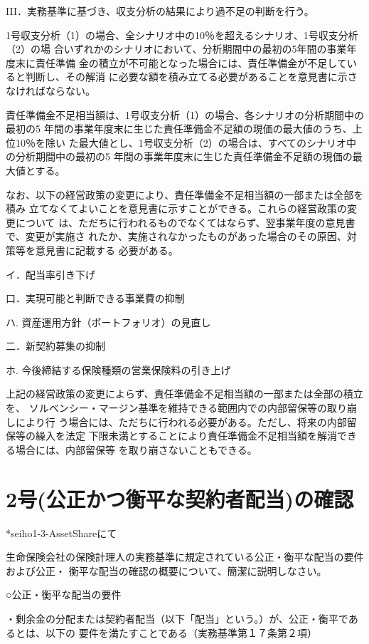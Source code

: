 \documentclass[report,gutter=10mm,fore-edge=10mm,uplatex,dvipdfmx]{jlreq}
\begin{document}
III．実務基準に基づき、収支分析の結果により過不足の判断を行う。

1号収支分析（1）の場合、全シナリオ中の10％を超えるシナリオ、1号収支分析（2）の場
合いずれかのシナリオにおいて、分析期間中の最初の5年間の事業年度末に責任準備
金の積立が不可能となった場合には、責任準備金が不足していると判断し、その解消
に必要な額を積み立てる必要があることを意見書に示さなければならない。

責任準備金不足相当額は、1号収支分析（1）の場合、各シナリオの分析期間中の最初の5
年間の事業年度末に生じた責任準備金不足額の現価の最大値のうち、上位10％を除い
た最大値とし、1号収支分析（2）の場合は、すべてのシナリオ中の分析期間中の最初の5
年間の事業年度末に生じた責任準備金不足額の現価の最大値とする。

なお、以下の経営政策の変更により、責任準備金不足相当額の一部または全部を積み
立てなくてよいことを意見書に示すことができる。これらの経営政策の変更について
は、ただちに行われるものでなくてはならず、翌事業年度の意見書で、変更が実施さ
れたか、実施されなかったものがあった場合のその原因、対策等を意見書に記載する
必要がある。

イ．配当率引き下げ

口．実現可能と判断できる事業費の抑制

ハ. 資産運用方針（ポートフォリオ）の見直し

二．新契約募集の抑制

ホ. 今後締結する保険種類の営業保険料の引き上げ

上記の経営政策の変更によらず、責任準備金不足相当額の一部または全部の積立を、
ソルベンシー・マージン基準を維持できる範囲内での内部留保等の取り崩しにより行
う場合には、ただちに行われる必要がある。ただし、将来の内部留保等の繰入を法定
下限未満とすることにより責任準備金不足相当額を解消できる場合には、内部留保等
を取り崩さないこともできる。


\section{2号(公正かつ衡平な契約者配当)の確認}

*seiho1-3-AssetShareにて

生命保険会社の保険計理人の実務基準に規定されている公正・衡平な配当の要件および公正・
衡平な配当の確認の概要について、簡潔に説明しなさい。

\answer{}
○公正・衡平な配当の要件

・剰余金の分配または契約者配当（以下「配当」という。）が、公正・衡平であるとは、以下の
要件を満たすことである（実務基準第１７条第２項）
\end{document}
